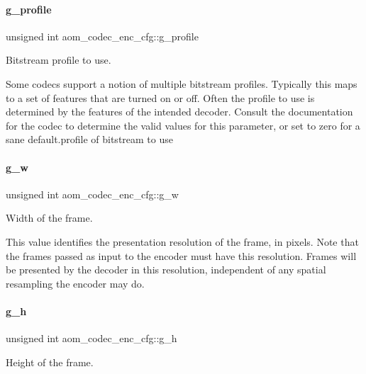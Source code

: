\paragraph{\texorpdfstring{g\+\_\+profile}{g\_profile}}
{\footnotesize\ttfamily unsigned int aom\+\_\+codec\+\_\+enc\+\_\+cfg\+::g\+\_\+profile}



Bitstream profile to use. 

Some codecs support a notion of multiple bitstream profiles. Typically this maps to a set of features that are turned on or off. Often the profile to use is determined by the features of the intended decoder. Consult the documentation for the codec to determine the valid values for this parameter, or set to zero for a sane default.\+profile of bitstream to use \mbox{\label{structaom__codec__enc__cfg_a80cb459c5ef3c7e1516f617c4c9d6eab}} 
\paragraph{\texorpdfstring{g\+\_\+w}{g\_w}}
{\footnotesize\ttfamily unsigned int aom\+\_\+codec\+\_\+enc\+\_\+cfg\+::g\+\_\+w}



Width of the frame. 

This value identifies the presentation resolution of the frame, in pixels. Note that the frames passed as input to the encoder must have this resolution. Frames will be presented by the decoder in this resolution, independent of any spatial resampling the encoder may do. \mbox{\label{structaom__codec__enc__cfg_a37b0f57b63bec8d133df8901d4407ee6}} 
\paragraph{\texorpdfstring{g\+\_\+h}{g\_h}}
{\footnotesize\ttfamily unsigned int aom\+\_\+codec\+\_\+enc\+\_\+cfg\+::g\+\_\+h}



Height of the frame. 

